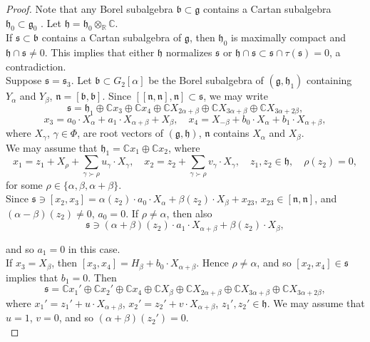 \documentclass[10pt]{article}
\begin{document}
\begin{proof}
Note that any Borel subalgebra $\mathfrak{b}\subset \mathfrak{g}$ contains a Cartan subalgebra $\mathfrak{h}_0\subset \mathfrak{g}_0$ \cite{Wolf}. Let $\mathfrak{h} = \mathfrak{h}_0\otimes_{\mathbb R}\mathbb C$.\\

If $\mathfrak{s}\subset \mathfrak{b}$ contains a Cartan subalgebra of $\mathfrak{g}$, then $\mathfrak{h}_0$ is maximally compact and $\mathfrak{h} \cap \mathfrak{s} \neq 0$. This implies that either $\mathfrak{h}$ normalizes $\mathfrak{s}$ or $\mathfrak{h} \cap \mathfrak{s}\subset \mathfrak{s}\cap \tau (\mathfrak{s})=0$, a contradiction.\\

Suppose $\mathfrak{s}=\mathfrak{s}_3$. Let $\mathfrak{b}\subset G_2[\alpha]$ be the Borel subalgebra of $(\mathfrak{g},\mathfrak{h}_1)$ containing $Y_{\alpha}$ and $Y_{\beta}$, $\mathfrak{n}=[\mathfrak{b},\mathfrak{b}]$. Since $[[\mathfrak{n},\mathfrak{n}],\mathfrak{n}]\subset \mathfrak{s}$, we may write 
$$
\mathfrak{s} = \mathfrak{h}_1\oplus \mathbb C x_3 \oplus \mathbb C x_4 \oplus \mathbb C X_{2\alpha +\beta}\oplus \mathbb C X_{3\alpha +\beta}\oplus \mathbb C X_{3\alpha +2\beta},
$$
$$
x_3=a_0\cdot X_{\alpha}+a_1\cdot X_{\alpha +\beta}+ X_{\beta}, \quad x_4=X_{-\beta}+b_0\cdot X_{\alpha}+b_1\cdot X_{\alpha +\beta},
$$
where $X_{\gamma}$, $\gamma\in \Phi$, are root vectors of $(\mathfrak{g},\mathfrak{h})$, $\mathfrak{n}$ contains $X_{\alpha}$ and $X_{\beta}$.\\

We may assume that $\mathfrak{h}_1=\mathbb C x_1\oplus \mathbb C x_2$, where
$$
x_1=z_1+X_{\rho}+\sum\limits_{\gamma \succ \rho}u_{\gamma}\cdot X_{\gamma},\quad x_2=z_2+\sum\limits_{\gamma \succ \rho}v_{\gamma}\cdot X_{\gamma},\quad z_1,z_2\in \mathfrak{h},\quad \rho (z_2)=0,
$$
for some $\rho\in \{ \alpha , \beta , \alpha + \beta \}$.\\

Since $\mathfrak{s}\ni [x_2,x_3]=\alpha (z_2)\cdot a_0\cdot X_{\alpha}+\beta (z_2)\cdot X_{\beta}+x_{23}$, $x_{23}\in [\mathfrak{n},\mathfrak{n}]$, and $(\alpha -\beta )(z_2)\neq 0$, $a_0=0$. If $\rho \neq \alpha$, then also
$$
\mathfrak{s}\ni (\alpha +\beta )(z_2)\cdot a_1\cdot X_{\alpha +\beta}+\beta (z_2)\cdot X_{\beta},
$$

and so $a_1=0$ in this case.\\

If $x_3=X_{\beta}$, then $[x_3,x_4]=H_{\beta} +b_0\cdot X_{\alpha +\beta}$. Hence $\rho \neq \alpha $, and so $[x_2,x_4]\in \mathfrak{s}$ implies that $b_1=0$. Then
$$
\mathfrak{s}=\mathbb C x_1' \oplus \mathbb C x_2' \oplus \mathbb C x_4 \oplus \mathbb C X_{\beta} \oplus \mathbb C X_{2\alpha + \beta} \oplus  \mathbb C X_{3\alpha + \beta} \oplus \mathbb C X_{3\alpha + 2\beta},
$$
where $x_1'=z_1'+u\cdot X_{\alpha +\beta}$, $x_2'=z_2'+v\cdot X_{\alpha +\beta}$, $z_1',z_2'\in \mathfrak{h}$. We may assume that $u=1$, $v=0$, and so $(\alpha +\beta )(z_2')=0$.\\


\end{proof}
\end{document}
